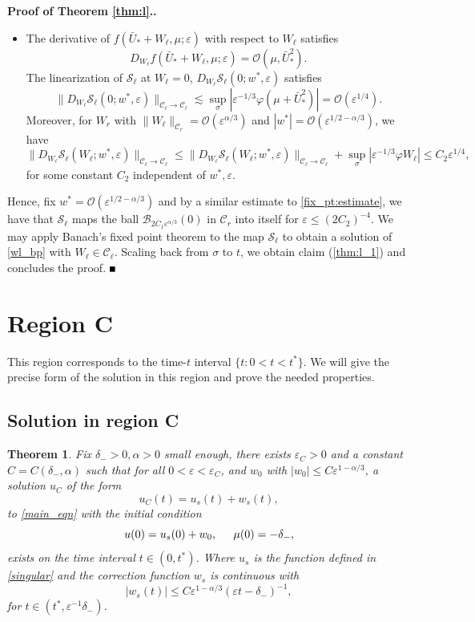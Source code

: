 \documentclass[letterpaper,11pt]{article}
\newcommand{\rmO}{\mathcal{O}}
\newcommand{\eps}{\varepsilon}
\newcommand{\lar}{ \lesssim }
\numberwithin{equation}{section}
\theoremstyle{plain}
\newtheorem{Theorem}{Theorem}
\newenvironment{Proof}[1][\unskip]%
 {\begin{trivlist} \item[]{\bf Proof #1. }}%
 {\hspace*{\fill}$\rule{.4\baselineskip}{.4\baselineskip}$\end{trivlist}}
\begin{document}
\begin{Proof}[ of Theorem \ref{thm:l}.]
\begin{itemize}
\item The derivative of $f(\bar{U}_*+W_\ell,\mu;\eps)$ with respect to $W_\ell$ satisfies \[
D_{W_\ell} f(\bar{U}_*+W_\ell,\mu;\eps)=\rmO(\mu, \bar{U}_*^2).
\] 
The linearization of $\mathcal{S}_\ell$ at $W_\ell=0$, $D_{W_\ell} \mathcal{S}_\ell(0;w^*,\eps)$ satisfies
\[
\|D_{W_\ell} \mathcal{S}_{\ell}(0;w^*,\eps)\|_{\mathcal{C}_\ell\to\mathcal{C}_\ell} \lar \sup_{\sigma}|\eps^{-1/3}\varphi(\mu+\bar{U}_*^2)| = \rmO(\eps^{1/4}).
\]
Moreover, for $W_r$ with $\|W_\ell\|_{\mathcal{C}_r}= \rmO(\eps^{\alpha/3})$ and $|w^*| =\rmO(\eps^{1/2-\alpha/3})$, we have \[
\|D_{W_\ell}\mathcal{S}_\ell(W_\ell;w^*,\eps)\|_{\mathcal{C}_\ell \to \mathcal{C}_\ell} \le  \|D_{W_\ell}\mathcal{S}_\ell(W_\ell;w^*,\eps)\|_{\mathcal{C}_\ell \to \mathcal{C}_\ell}+\sup_{\sigma}|\eps^{-1/3}\varphi W_\ell| \le C_2\eps^{1/4},
\]
for some constant $C_2$ independent of $w^*,\eps$.
\end{itemize}

Hence, fix $w^* = \rmO(\eps^{1/2-\alpha/3})$ and by a similar estimate to \eqref{fix_pt:estimate}, we have that $\mathcal{S}_\ell$ maps the ball $\mathcal{B}_{2C_1\eps^{\alpha/3}}(0)$ in $\mathcal{C}_r$ into itself for $\eps \le (2C_2)^{-4}$. We may apply Banach's fixed point theorem to the map $\mathcal{S}_\ell$ to obtain a solution of \eqref{wl_bp} with $W_\ell \in \mathcal{C}_\ell$. Scaling back from $\sigma$ to $t$, we obtain claim (\ref{thm:l_1}) and concludes the proof.
\end{Proof}


\section{Region C}\label{sec_C}
This region corresponds to the time-$t$ interval $\{t: 0<t<t^*\}$. We will give the precise form of the solution in this region and prove the needed properties.

\subsection{Solution in region C}
\begin{Theorem}\label{thm:s}
Fix $\delta_->0, \alpha>0$ small enough, there exists $\eps_C>0$ and a constant $C=C(\delta_-,\alpha)$ such that for all $0<\eps <\eps_C$, and $w_0$ with $|w_0| \le  C\eps^{1-\alpha/3}$, a solution $u_C$ of the form 
\begin{equation}
u_C(t) = u_s(t) + w_s(t),
\end{equation}
to \eqref{main_eqn} with the initial condition
\begin{equation}\label{us_ic}
u(0) = u_s(0) + w_0, \hspace{0.2in}\mu(0) =  -\delta_-,
\end{equation}
exists on the time interval $t \in (0, t^*)$. Where $u_s$ is the function defined in \eqref{singular} and the correction function $w_s$ is continuous with
\begin{equation}\label{thm:s_1}
|w_s(t)| \le C\eps^{1-\alpha/3} (\eps t -\delta_-)^{-1},
\end{equation}
for $t \in (t^*, \eps^{-1}\delta_-)$.
\end{Theorem}
\end{document}
